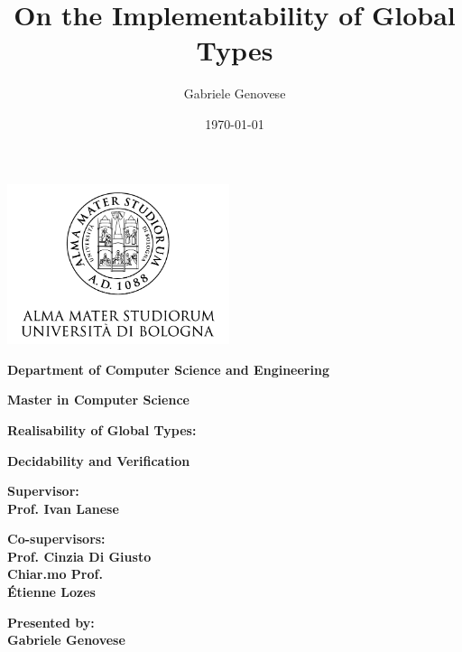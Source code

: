 \documentclass[12pt,a4paper,twoside]{book}
\title{On the Implementability of Global Types}
\author{Gabriele Genovese}
\date{\today}
\theoremstyle{definition}
\theoremstyle{definition}
\theoremstyle{definition}
\begin{document}
\begin{titlepage}
\begin{center}
    \includegraphics[width=6.5cm,height=4.7cm]{img/unibo.png}
    
    \vspace{10mm}
   
    {\large{\bf{Department of Computer Science and Engineering}}} 
    
    \vspace{5mm}

    {\Large{\bf{Master in Computer Science}}}
    
    \vspace{15mm}
    
    {\Huge{\bf Realisability of Global Types: }}\\
    
    \vspace{3mm}
    
    {\Huge{\bf Decidability and Verification }}\\
   
    \vspace{3mm}
\end{center}

\vspace{10mm}

\begin{minipage}[t]{0.45\textwidth}
    
    {\large{\bf Supervisor: \\ Prof. Ivan Lanese}}
    
    \vspace{3mm}
    
    {\large{\bf Co-supervisors:\\Prof. Cinzia Di Giusto\\Chiar.mo Prof.\\Étienne Lozes}}
\end{minipage}
\hfill
\begin{minipage}[t]{0.37\textwidth}\raggedleft
    {\large{\bf Presented by: \\ Gabriele Genovese}}\\
    

\end{minipage}
\end{titlepage}
\end{document}

